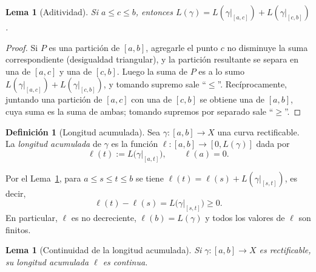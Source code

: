 \documentclass[12pt, a4paper]{amsart}
\newtheorem{lema}[teorema]{Lema}
\theoremstyle{definition}
\newtheorem{definicion}[teorema]{Definición}
\theoremstyle{remark}
\begin{document}
\begin{lema}[Aditividad]\label{lem:aditividad}
Si $a\le c\le b$, entonces $L(\gamma)=L(\gamma|_{[a,c]})+L(\gamma|_{[c,b]})$.
\end{lema}

\begin{proof}
Si $P$ es una partición de $[a,b]$, agregarle el punto $c$ no disminuye la suma correspondiente (desigualdad triangular), y la partición resultante se separa en una de $[a,c]$ y una de $[c,b]$. Luego la suma de $P$ es a lo sumo $L(\gamma|_{[a,c]})+L(\gamma|_{[c,b]})$, y tomando supremo sale ``$\le$''. Recíprocamente, juntando una partición de $[a,c]$ con una de $[c,b]$ se obtiene una de $[a,b]$, cuya suma es la suma de ambas; tomando supremos por separado sale ``$\ge$''.
\end{proof}

\begin{definicion}[Longitud acumulada]\label{def:ell}
Sea $\gamma\colon[a,b]\to X$ una curva rectificable. La \emph{longitud acumulada} de $\gamma$ es la función $\ell\colon[a,b]\to[0,L(\gamma)]$ dada por
\[
\ell(t):=L\big(\gamma|_{[a,t]}\big),\qquad \ell(a)=0.
\]
\end{definicion}

Por el Lema~\ref{lem:aditividad}, para $a\le s\le t\le b$ se tiene $\ell(t)=\ell(s)+L(\gamma|_{[s,t]})$, es decir,
\begin{equation}\label{eq:ell-dif}
\ell(t)-\ell(s)=L\big(\gamma|_{[s,t]}\big)\ge0 .
\end{equation}
En particular, $\ell$ es no decreciente, $\ell(b)=L(\gamma)$ y todos los valores de $\ell$ son finitos.

\begin{lema}[Continuidad de la longitud acumulada]\label{lem:continuidad}
Si $\gamma\colon[a,b]\to X$ es rectificable, su longitud acumulada $\ell$ es continua.
\end{lema}
\end{document}
